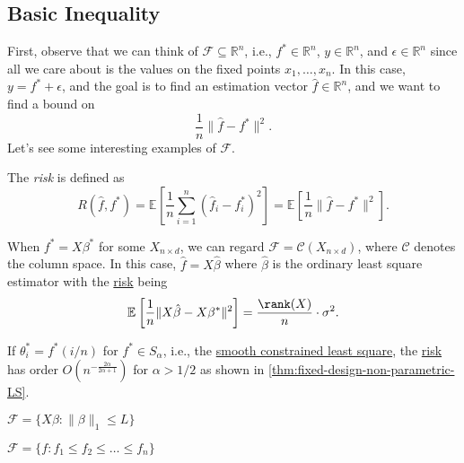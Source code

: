 \subsection{Basic Inequality}
First, observe that we can think of \(\mathscr{F} \subseteq \mathbb{R} ^n\), i.e., \(f^{\ast} \in \mathbb{R} ^n\), \(y\in \mathbb{R} ^n\), and \(\epsilon \in \mathbb{R} ^n\) since all we care about is the values on the fixed points \(x_1, \dots , x_n\). In this case, \(y = f^{\ast} + \epsilon \), and the goal is to find an estimation vector \(\hat{f} \in \mathbb{R} ^n\), and we want to find a bound on
\[
	\frac{1}{n} \lVert \hat{f} - f^{\ast} \rVert ^2.
\]
Let's see some interesting examples of \(\mathscr{F} \).

\begin{notation}[Risk]\label{not:risk}
	The \emph{risk} is defined as
	\[
		R(\hat{f} , f^{\ast} )
		= \mathbb{E}_{}\left[ \frac{1}{n} \sum_{i=1}^{n} (\hat{f} _i - f^{\ast} _i)^2 \right]
		= \mathbb{E}_{}\left[ \frac{1}{n} \lVert \hat{f} - f^{\ast} \rVert ^2 \right] .
	\]
\end{notation}

\begin{eg}
	When \(f^{\ast} = X \beta ^{\ast} \) for some \(X_{n \times d}\), we can regard \(\mathscr{F} = \mathcal{C} (X_{n\times d})\), where \(\mathcal{C} \) denotes the column space. In this case, \(\hat{f} = X \hat{\beta} \) where \(\hat{\beta} \) is the ordinary least square estimator with the \hyperref[not:risk]{risk} being
	\[
		\mathbb{E}_{}\left[\frac{1}{n} \lVert X \hat{\beta} - X \beta ^{\ast} \rVert ^2 \right] = \frac{\rank (X)}{n} \cdot \sigma ^2.
	\]
\end{eg}

\begin{eg}
	If \(\theta ^{\ast} _i = f^{\ast} (i / n)\) for \(f^{\ast} \in S_\alpha \), i.e., the \hyperref[prb:smooth-LS]{smooth constrained least square}, the \hyperref[not:risk]{risk} has order \(O(n^{- \frac{2\alpha }{2\alpha + 1}})\) for \(\alpha > 1 / 2\) as shown in \autoref{thm:fixed-design-non-parametric-LS}.
\end{eg}

\begin{eg}
	\(\mathscr{F} = \{ X \beta \colon \lVert \beta \rVert _1 \leq L \} \)
\end{eg}

\begin{eg}
	\(\mathscr{F} = \{f \colon f_1 \leq f_2 \leq \dots \leq f_n \} \)
\end{eg}

